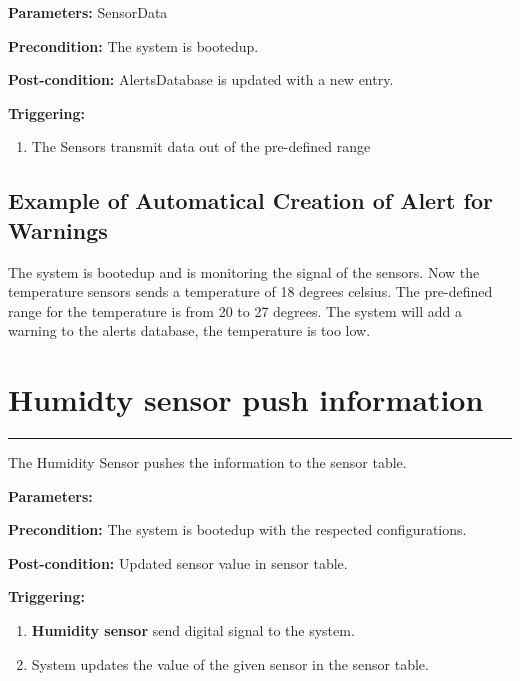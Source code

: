 \begin{description}

\item \textbf{Parameters:} SensorData
\item \textbf{Precondition:} The system is bootedup.
\item \textbf{Post-condition:} AlertsDatabase is updated with a new entry.

\item \textbf{Triggering:}
\begin{enumerate}
\item The Sensors transmit data out of the pre-defined range
\end{enumerate}
\end{description}

\subsection{Example of Automatical Creation of Alert for Warnings}
The system is bootedup and is monitoring the signal of the sensors.
Now the temperature sensors sends a temperature of 18 degrees celsius. The
pre-defined range for the temperature is from 20 to 27 degrees. The system will
add a warning to the alerts database, the temperature is too low.






















\break



\section{Humidty sensor push information}

\hrule
\hfill
\vspace{0.5cm}
\label{operation:Humidty sensor push information}

The Humidity Sensor pushes the information to the sensor table.
\begin{description}
\item \textbf{Parameters:} 
\item \textbf{Precondition:} The system is bootedup with the respected
configurations.
\item \textbf{Post-condition:} Updated sensor value in sensor table.

\item \textbf{Triggering:}
\begin{enumerate}
\item \textbf{Humidity sensor} send digital signal to the system.
\item System updates the value of the given sensor in the sensor table.
\end{enumerate}
\end{description}

